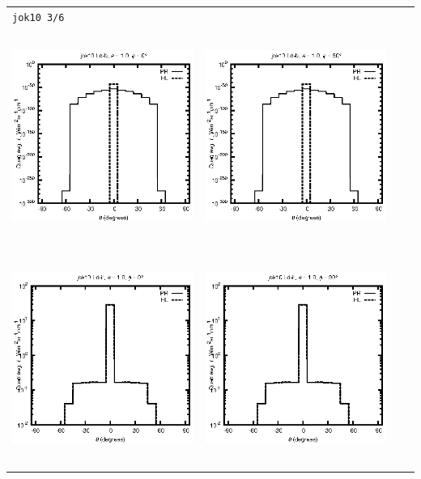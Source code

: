 \begin{tabular}{c c c c}
\multicolumn{4}{l}{\texttt{jok10 3/6}} \\
\includegraphics[height=7cm]{../eps/jok10_Ld_b_fwd.eps} &
\includegraphics[height=7cm]{../eps/jok10_Ld_b_cross.eps} \\
\includegraphics[height=7cm]{../eps/jok10_Ld_it_fwd.eps} &
\includegraphics[height=7cm]{../eps/jok10_Ld_it_cross.eps} \\

\end{tabular}
